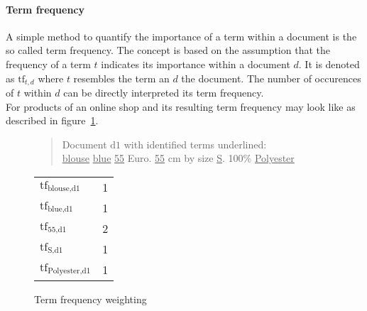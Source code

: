 \paragraph{Term frequency}
\label{sec:tf}
A simple method to quantify the importance of a term within a document is the so called term frequency.
The concept is based on the assumption that the frequency of a term $t$ indicates its importance within a document $d$.
It is denoted as $\text{tf}_{t,d}$ where $t$ resembles the term an $d$ the document.
The number of occurences of $t$ within $d$ can be directly interpreted its term frequency.\citep[p.~117]{manning:2009}\\
For products of an online shop and its resulting term frequency may look like as described in figure~\ref{fig:tfweighting}.\\
\begin{figure}[h]

    \begin{quote}
        Document $\text{d}1$ with identified terms underlined:\\
        \underline{blouse} \underline{blue} \underline{55} Euro. \underline{55} cm by size \underline{S}. 100\% \underline{Polyester}
    \end{quote}

    \center
    \vspace{5mm}
    \begin{tabular}{ l l }
        \rowcolor{\dustRowHead}
        \multicolumn{2}{c}{Term frequency}\\\hline
        $\text{tf}_{\text{blouse},\text{d1}}$       & 1\\
        $\text{tf}_{\text{blue},\text{d1}}$         & 1\\
        $\text{tf}_{\text{55},\text{d1}}$           & 2\\
        $\text{tf}_{\text{S},\text{d1}}$            & 1\\
        $\text{tf}_{\text{Polyester},\text{d1}}$    & 1\\
    \end{tabular}

    \caption{Term frequency weighting}
    \label{fig:tfweighting}
\end{figure}

